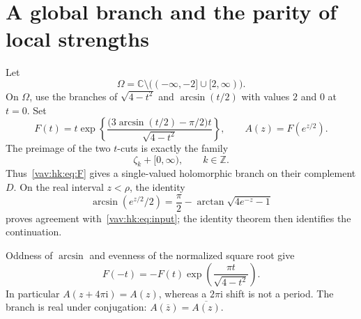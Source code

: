 \documentclass[11pt]{article}
\theoremstyle{remark}\newtheorem{remark}[theorem]{Remark}
\newcommand{\ii}{\mathrm i}
\newcommand{\C}{\mathbb C}
\newcommand{\Z}{\mathbb Z}
\begin{document}
\section{A global branch and the parity of local strengths}\label{vav:hk:sec:branch}
Let
\[
 \Omega=\C\setminus\bigl(({-\infty},-2]\cup[2,\infty)\bigr).
\]
On $\Omega$, use the branches of $\sqrt{4-t^2}$ and $\arcsin(t/2)$ with values $2$ and $0$ at $t=0$. Set
\begin{equation}\label{vav:hk:eq:F}
 F(t)=t\exp\left\{
 \frac{\bigl(3\arcsin(t/2)-\pi/2\bigr)t}{\sqrt{4-t^2}}
 \right\},\qquad A(z)=F(e^{z/2}).
\end{equation}
The preimage of the two $t$-cuts is exactly the family
\[
 \zeta_k+[0,\infty),\qquad k\in\Z.
\]
Thus~\eqref{vav:hk:eq:F} gives a single-valued holomorphic branch on their complement $D$. On the real interval $z<\rho$, the identity
\[
 \arcsin(e^{z/2}/2)=\frac\pi2-\arctan\sqrt{4e^{-z}-1}
\]
proves agreement with~\eqref{vav:hk:eq:input}; the identity theorem then identifies the continuation.

Oddness of $\arcsin$ and evenness of the normalized square root give
\begin{equation}\label{vav:hk:eq:shift}
 F(-t)=-F(t)\exp\left(\frac{\pi t}{\sqrt{4-t^2}}\right).
\end{equation}
In particular $A(z+4\pi\ii)=A(z)$, whereas a $2\pi\ii$ shift is not a period. The branch is real under conjugation: $A(\overline z)=\overline{A(z)}$.
\end{document}
